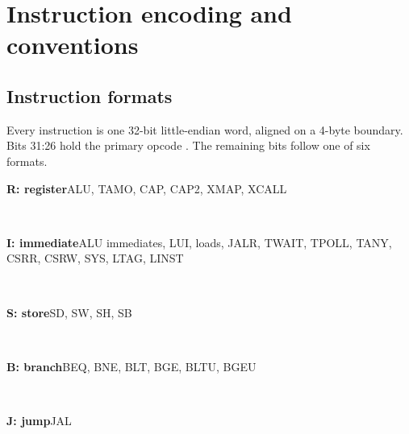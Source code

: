\chapter{Instruction encoding and conventions}\label{ch:encoding}

\section{Instruction formats}\label{sec:formats}

Every instruction is one 32-bit little-endian word, aligned on a 4-byte boundary. Bits 31:26 hold the
primary opcode . The remaining bits follow one of six formats.

\newcommand{\fmtrow}[2]{\par\noindent\textbf{#1}\hfill\small #2\par\nobreak}

\fmtrow{R: register}{ALU, TAMO, CAP, CAP2, XMAP, XCALL}
\begin{encoding}
\\
\end{encoding}

\fmtrow{I: immediate}{ALU immediates, LUI, loads, JALR, TWAIT, TPOLL, TANY, CSRR, CSRW, SYS, LTAG, LINST}
\begin{encoding}
\\
\end{encoding}

\fmtrow{S: store}{SD, SW, SH, SB}
\begin{encoding}
\\
\end{encoding}

\fmtrow{B: branch}{BEQ, BNE, BLT, BGE, BLTU, BGEU}
\begin{encoding}
\\
\end{encoding}

\fmtrow{J: jump}{JAL}
\begin{encoding}
\\
\end{encoding}

